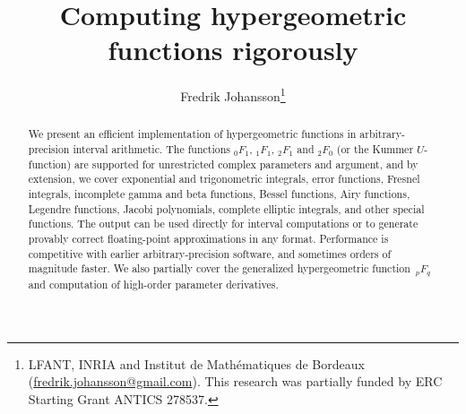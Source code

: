 \documentclass[11pt,a4paper]{article}
\begin{document}
\title{Computing hypergeometric functions rigorously}


\author{Fredrik Johansson\footnote{LFANT, INRIA and Institut de Math\'{e}matiques de Bordeaux (\protect\url{fredrik.johansson@gmail.com}).
  This research was partially funded by ERC Starting Grant ANTICS 278537.}}

\date{}

\maketitle

\begin{abstract}
We present an efficient implementation of hypergeometric functions
in arbitrary-precision interval arithmetic.
The functions ${}_0F_1$, ${}_1F_1$, ${}_2F_1$ and ${}_2F_0$
(or the Kummer $U$-function) are supported
for unrestricted complex parameters and argument,
and by extension,
we cover
exponential and trigonometric integrals, error functions, Fresnel integrals,
incomplete gamma and beta functions, Bessel functions, Airy functions,
Legendre functions, Jacobi polynomials,
complete elliptic integrals, and other special functions.
The output can be used directly for interval computations
or to generate provably correct floating-point approximations in any format.
Performance is competitive with earlier arbitrary-precision software, and
sometimes orders of magnitude faster.
We also partially cover the generalized hypergeometric function~${}_pF_q$
and computation of high-order parameter derivatives.
\end{abstract}


\end{document}
